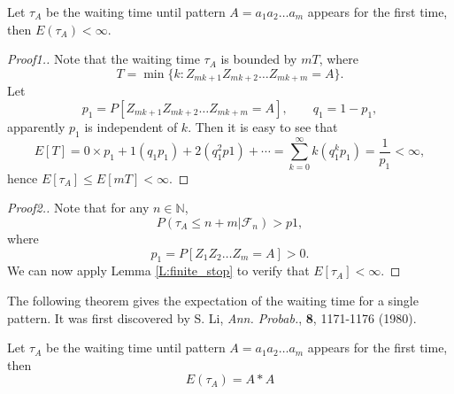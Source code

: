 \begin{lemma} \label{L:toss_stop}
Let $\tau_A$ be the waiting time until pattern $A=a_1 a_2 \dots a_m$ appears for
the first time, then $E(\tau_A)<\infty$.
\end{lemma}
\begin{proof}[Proof1.]
Note that the waiting time $\tau_A$ is bounded by $mT$, where
\[
  T = \min\{k: Z_{mk+1}Z_{mk+2}\dots Z_{mk+m}=A \}.
\]
Let 
\[
  p_1 = P[Z_{mk+1}Z_{mk+2}\dots Z_{mk+m}=A], \qquad q_1=1- p_1,
\]
apparently $p_1$ is independent of $k$. Then it is easy to see that
\[
  E[T] = 0 \times p_1 + 1(q_1 p_1) + 2 (q_1^2 p1) + \cdots
       = \sum_{k=0}^{\infty} k(q_1^k p_1) = \frac{1}{p_1} <\infty,
\]
hence $E[\tau_A]\le E[mT]<\infty$.
\end{proof}
\begin{proof}[Proof2.]
Note that for any $n\in\mathbb{N}$, 
\[
  P(\tau_A\le n+m | \mathcal{F}_n) > p1, 
\]
where
\[
  p_1 = P[Z_{1}Z_{2}\dots Z_{m}=A] > 0.
\]
We can now apply Lemma \ref{L:finite_stop} to verify that
$E[\tau_A]<\infty$.
\end{proof}

The following theorem gives the expectation of the waiting time for a single
pattern. It was first discovered by S. Li, \textit{Ann. Probab.}, 
\textbf{8}, 1171-1176 (1980).

\begin{theorem}
Let $\tau_A$ be the waiting time until pattern $A=a_1 a_2 \dots a_m$ appears for
the first time, then
\begin{equation}
  E(\tau_A)=A \ast A
\end{equation}
\end{theorem}

